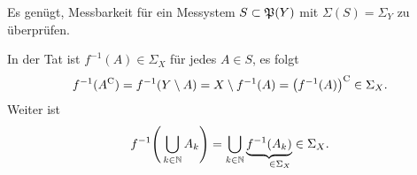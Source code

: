 \documentclass[skript.tex]{subfiles}
\begin{document}
		\begin{bem}
			Es genügt, Messbarkeit für ein Messystem $S \subset \mathfrak{P}(Y)$ mit $\Sigma(S) = \Sigma_Y$
			zu überprüfen.
			
			In der Tat ist $f^{-1}(A) \in \Sigma_X$ für jedes $A \in S$, es folgt
			\[
				f^{-1}(A^\mathrm{C}) = f^{-1}(Y \setminus A) = X \setminus f^{-1}(A) 
				= \big(f^{-1}(A)\big)^\mathrm{C} \in \Sigma_X.
			\]
			Weiter ist
			\[
				f^{-1}{\Bigg( \bigcup_{k\in\N} A_k \Bigg) 
				= \bigcup_{k\in\N} \underbrace{f^{-1}(A_k)}_{\mathrlap{\in \Sigma_X}}
				\in \Sigma_X}.
			\]
		\end{bem}



		
\end{document}
